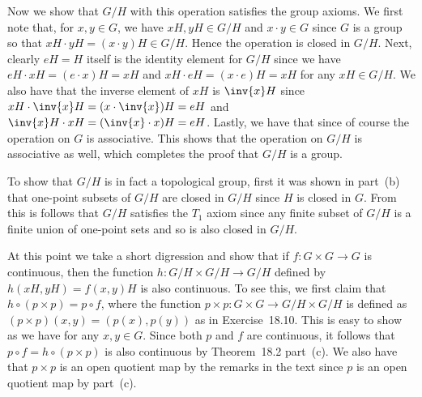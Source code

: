 {{    Now we show that $G/H$ with this operation satisfies the group axioms.
    We first note that, for $x,y \in G$, we have $xH,yH \in G/H$ and $x \cdot y \in G$ since $G$ is a group so that $xH \cdot yH = (x \cdot y)H \in G/H$.
    Hence the operation is closed in $G/H$.
    Next, clearly $eH = H$ itself is the identity element for $G/H$ since we have $eH \cdot xH = (e \cdot x)H = xH$ and $xH \cdot eH = (x \cdot e)H = xH$ for any $xH \in G/H$.
    We also have that the inverse element of $xH$ is $\inv{x} H$ since $xH \cdot \inv{x}H = (x \cdot \inv{x})H = eH$ and $\inv{x}H \cdot xH = (\inv{x} \cdot x)H = eH$.
    Lastly, we have that
    since of course the operation on $G$ is associative.
    This shows that the operation on $G/H$ is associative as well, which completes the proof that $G/H$ is a group.

    To show that $G/H$ is in fact a topological group, first it was shown in part~(b) that one-point subsets of $G/H$ are closed in $G/H$ since $H$ is closed in $G$.
    From this is follows that $G/H$ satisfies the $T_1$ axiom since any finite subset of $G/H$ is a finite union of one-point sets and so is also closed in $G/H$.

    At this point we take a short digression and show that if $f: G \times G \to G$ is continuous, then the function $h : G/H \times G/H \to G/H$ defined by $h(xH, yH) = f(x,y)H$ is also continuous.
    To see this, we first claim that $h \circ (p \times p) = p \circ f$, where the function $p \times p : G \times G \to G/H \times G/H$ is defined as $(p \times p)(x,y) = (p(x),p(y))$ as in Exercise~18.10.
    This is easy to show as we have
    for any $x,y \in G$.
    Since both $p$ and $f$ are continuous, it follows that $p \circ f = h \circ (p \times p)$ is also continuous by Theorem~18.2 part~(c).
    We also have that $p \times p$ is an open quotient map by the remarks in the text since $p$ is an open quotient map by part~(c).

}}
